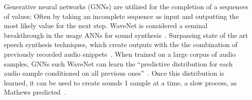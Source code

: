 \documentclass[\main/thesis.tex]{subfiles}
\begin{document}
Generative neural networks (GNNs) are utilized for the completion of a sequences of values; Often by taking an incomplete sequence as input and outputting the most likely value for the next step. WaveNet is considered a seminal breakthrough in the usage ANNs for sound synthesis~\cite{oord2016wavenet}. Surpassing state of the art speech synthesis techniques, which create outputs with the the combination of previously recorded audio snippets~\cite{schwarz2007corpus}. When trained on a large corpus of audio samples, GNNs such WaveNet can learn the \enquote{predictive distribution for each
audio sample conditioned on all previous ones}~\cite{oord2016wavenet}. Once this distribution is learned, it can be used to create sounds 1 sample at a time, a slow process, as Mathews predicted~\cite{mathews1963digital}. \\
\end{document}
